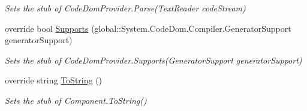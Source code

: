 \begin{DoxyCompactItemize}
\begin{DoxyCompactList}\small\item\em Sets the stub of Code\-Dom\-Provider.\-Parse(\-Text\-Reader code\-Stream)\end{DoxyCompactList}\item 
override bool \hyperlink{class_system_1_1_code_dom_1_1_compiler_1_1_fakes_1_1_stub_code_dom_provider_ae41712c4429005d5317ecb916048b037}{Supports} (global\-::\-System.\-Code\-Dom.\-Compiler.\-Generator\-Support generator\-Support)
\begin{DoxyCompactList}\small\item\em Sets the stub of Code\-Dom\-Provider.\-Supports(\-Generator\-Support generator\-Support)\end{DoxyCompactList}\item 
override string \hyperlink{class_system_1_1_code_dom_1_1_compiler_1_1_fakes_1_1_stub_code_dom_provider_ab8ded3b2de9ecb4b3ab4d65d4e041184}{To\-String} ()
\begin{DoxyCompactList}\small\item\em Sets the stub of Component.\-To\-String()\end{DoxyCompactList}\end{DoxyCompactItemize}
